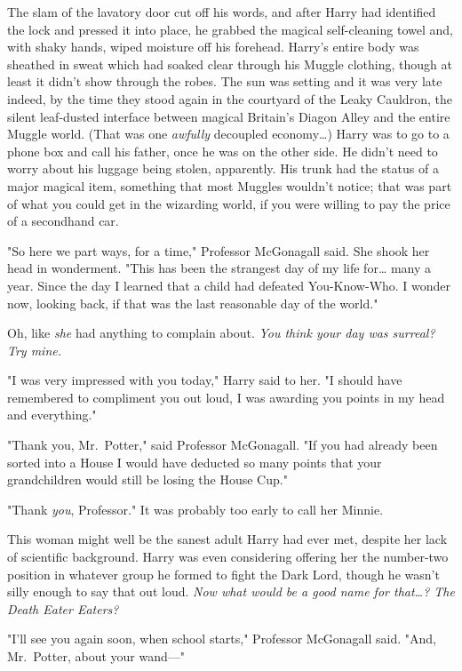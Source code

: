 The slam of the lavatory door cut off his words, and after Harry had identified 
the lock and pressed it into place, he grabbed the magical self-cleaning towel 
and, with shaky hands, wiped moisture off his forehead. Harry's entire body was 
sheathed in sweat which had soaked clear through his Muggle clothing, though at 
least it didn't show through the robes.
\sbreak
The sun was setting and it was very late indeed, by the time they stood again 
in the courtyard of the Leaky Cauldron, the silent leaf-dusted interface 
between magical Britain's Diagon Alley and the entire Muggle world. (That was 
one \emph{awfully} decoupled economy{\ldots}) Harry was to go to a phone box 
and call his father, once he was on the other side. He didn't need to worry 
about his luggage being stolen, apparently. His trunk had the status of a major 
magical item, something that most Muggles wouldn't notice; that was part of 
what you could get in the wizarding world, if you were willing to pay the price 
of a secondhand car.

"So here we part ways, for a time," Professor McGonagall said. She shook her 
head in wonderment. "This has been the strangest day of my life for{\ldots} 
many a year. Since the day I learned that a child had defeated You-Know-Who. I 
wonder now, looking back, if that was the last reasonable day of the world."

Oh, like \emph{she} had anything to complain about. \emph{You think your day 
was surreal? Try mine.}

"I was very impressed with you today," Harry said to her. "I should have 
remembered to compliment you out loud, I was awarding you points in my head and 
everything."

"Thank you, Mr.~Potter," said Professor McGonagall. "If you had already been 
sorted into a House I would have deducted so many points that your 
grandchildren would still be losing the House Cup."

"Thank \emph{you}, Professor." It was probably too early to call her Minnie.

This woman might well be the sanest adult Harry had ever met, despite her lack 
of scientific background. Harry was even considering offering her the 
number-two position in whatever group he formed to fight the Dark Lord, though 
he wasn't silly enough to say that out loud. \emph{Now what would be a good 
name for that{\ldots}? The Death Eater Eaters?}

"I'll see you again soon, when school starts," Professor McGonagall said. "And, 
Mr.~Potter, about your wand---"

